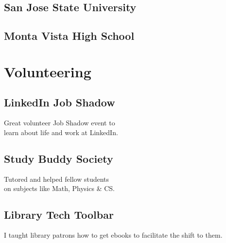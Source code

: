 \documentclass[]{deedy-resume-openfont}
\begin{document}
\begin{minipage}[t]{0.32\textwidth}
\subsection{San Jose State University}
\vspace{\topsep}
\sectionsep

\subsection{Monta Vista High School}
\vspace{\topsep}


\section{Volunteering}
\vspace{\topsep}
\subsection{LinkedIn Job Shadow}
\vspace{\topsep}
Great volunteer Job Shadow event to\\learn about life and work at LinkedIn.
\sectionsep

\subsection{Study Buddy Society}
\vspace{\topsep}
Tutored and helped fellow students\\on subjects like Math, Physics \& CS.
\sectionsep

\subsection{Library Tech Toolbar}
\vspace{\topsep}
I taught library patrons how to get ebooks to facilitate the shift to them.



\end{minipage}
\end{document}
